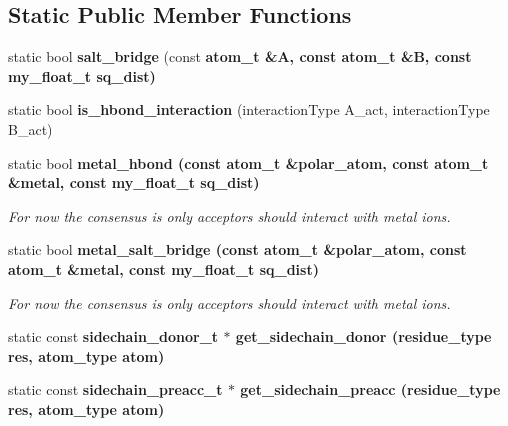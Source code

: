 \subsection*{Static Public Member Functions}
\begin{CompactItemize}
\item 
static bool \textbf{salt\_\-bridge} (const \bf{atom\_\-t} \&A, const \bf{atom\_\-t} \&B, const my\_\-float\_\-t sq\_\-dist)\label{classSimSite3D_1_1HbondGeometry_044cc1432011996eb5e9a27dd32874c9}

\item 
static bool \textbf{is\_\-hbond\_\-interaction} (interaction\-Type A\_\-act, interaction\-Type B\_\-act)\label{classSimSite3D_1_1HbondGeometry_c646aad45502f9c3f837cdf91700072a}

\item 
static bool \bf{metal\_\-hbond} (const \bf{atom\_\-t} \&polar\_\-atom, const \bf{atom\_\-t} \&metal, const my\_\-float\_\-t sq\_\-dist)\label{classSimSite3D_1_1HbondGeometry_40113626b71155acaeff6f20f4ff18b0}

\begin{CompactList}\small\item\em For now the consensus is only acceptors should interact with metal ions. \item\end{CompactList}\item 
static bool \bf{metal\_\-salt\_\-bridge} (const \bf{atom\_\-t} \&polar\_\-atom, const \bf{atom\_\-t} \&metal, const my\_\-float\_\-t sq\_\-dist)\label{classSimSite3D_1_1HbondGeometry_e35f9ba1e79c9ef6ec2595c6c5089214}

\begin{CompactList}\small\item\em For now the consensus is only acceptors should interact with metal ions. \item\end{CompactList}\item 
static const \bf{sidechain\_\-donor\_\-t} $\ast$ \textbf{get\_\-sidechain\_\-donor} (residue\_\-type res, atom\_\-type atom)\label{classSimSite3D_1_1HbondGeometry_744683e67955b2811701f4ac3c799545}

\item 
static const \bf{sidechain\_\-preacc\_\-t} $\ast$ \textbf{get\_\-sidechain\_\-preacc} (residue\_\-type res, atom\_\-type atom)\label{classSimSite3D_1_1HbondGeometry_73ea3b6706d0eea3353c6fe286f2239b}

\end{CompactItemize}
